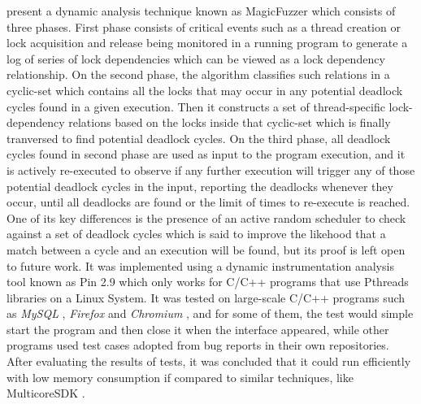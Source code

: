 \citet{magicfuzzer} present a dynamic analysis technique known as MagicFuzzer which consists of three phases.
First phase consists of critical events such as a thread creation or lock acquisition and release being monitored in a running program to generate
a log of series of lock dependencies which can be viewed as a lock dependency relationship.
On the second phase, the algorithm classifies such relations in a cyclic-set which contains all the locks that may occur in any
potential deadlock cycles found in a given execution.
Then it constructs a set of thread-specific lock-dependency relations based on the locks inside that cyclic-set which is finally tranversed to find potential deadlock cycles.
On the third phase, all deadlock cycles found in second phase are used as input to the program execution,
and it is actively re-executed to observe if any further execution will trigger any of those
potential deadlock cycles in the input, reporting the deadlocks whenever they occur, until all deadlocks are found or the limit of times to re-execute is reached.
One of its key differences is the presence of an active random scheduler to check against a set of deadlock cycles
which is said to improve the likehood that a match between a cycle and an execution will be found, but its proof is left open to future work.
It was implemented using a dynamic instrumentation analysis tool known as Pin 2.9 \citep{pin} which only works for C/C++ programs that use Pthreads libraries on a Linux System.
It was tested on large-scale C/C++ programs such as \emph{MySQL} \citep{mysql}, \emph{Firefox} \citep{firefox} and \emph{Chromium} \citep{chromium},
and for some of them, the test would simple start the program and then close it when the interface appeared, while other programs used test cases adopted
from bug reports in their own repositories. After evaluating the results of tests, it was concluded that it could run efficiently with low memory consumption
if compared to similar techniques, like MulticoreSDK \citep{mcsdk}.

